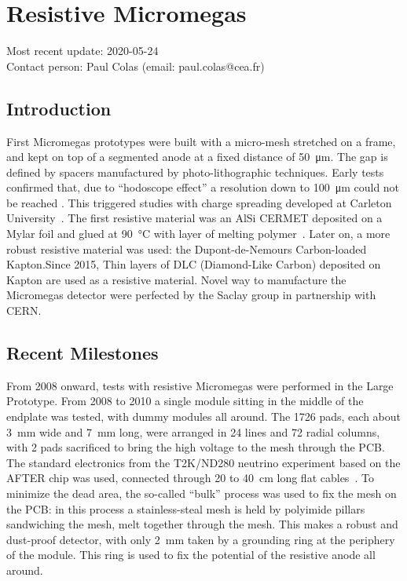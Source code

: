 \section{Resistive Micromegas}
\label{chap:TPC_sec:micromegas}
Most recent update: 2020-05-24\\
Contact person: Paul Colas (email: paul.colas@cea.fr)\\

\subsection{Introduction}
First Micromegas prototypes were built with a micro-mesh stretched on a frame, and kept on top of
a segmented anode at a fixed distance of \SI{50}{\micro\meter}. The gap is defined by spacers manufactured
by photo-lithographic techniques. Early tests confirmed that, due to ``hodoscope effect'' a resolution
down to \SI{100}{\micro\meter} could not be reached \cite{Arogancia:2007pt}. This triggered studies with charge spreading
developed at Carleton University~\cite{Dixit:2003qg}.
The first resistive material was an AlSi CERMET deposited on a Mylar foil and glued at
\SI{90}{\degreeCelsius} with layer of melting polymer~\cite{2007NIMPA.581..254D}. Later on, a more robust resistive material was
used: the Dupont-de-Nemours Carbon-loaded Kapton.Since 2015, Thin layers of DLC (Diamond-Like Carbon) deposited on Kapton are used as a resistive material. 
Novel way to manufacture the Micromegas detector
were perfected by the Saclay group in partnership with CERN.


\subsection{Recent Milestones}
From 2008 onward, tests with resistive Micromegas were performed in the Large Prototype. From 2008 to 2010
a single module sitting in the middle of the endplate was tested, with dummy modules all around. The 1726 pads, each about \SI{3}{mm} wide
and \SI{7}{mm} long,
were arranged in 24 lines and 72 radial columns, with 2 pads sacrificed to bring the high voltage to the mesh
through the PCB. The standard electronics from the T2K/ND280 neutrino experiment based on the AFTER chip
was used, connected through 20 to \SI{40}{cm} long flat cables~\cite{6418152}.
To minimize the dead area, the so-called ``bulk'' \cite{Giomataris:2004aa} process was used to fix the
mesh on the PCB: in this process a stainless-steal mesh is held by polyimide pillars sandwiching the mesh, melt together
through the mesh. This makes a robust and dust-proof detector, with only \SI{2}
{mm} taken by a grounding ring at the periphery of the module. This ring is used to fix the potential of the resistive anode all around.

